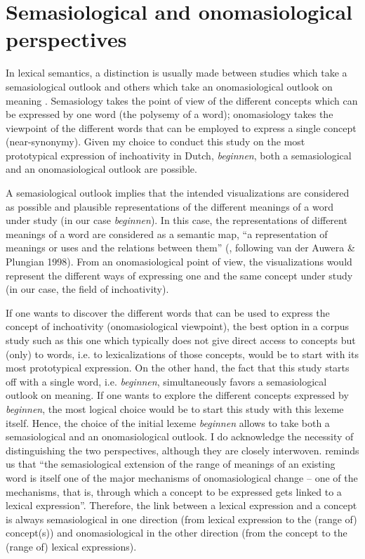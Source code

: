 \section{Semasiological and onomasiological perspectives} 
\label{sec:3.2}  
In lexical semantics, a distinction is usually made between studies which take a semasiological outlook and others which take an onomasiological outlook on meaning \citep{geeraerts_structure_1994}. Semasiology takes the point of view of the different concepts which can be expressed by one word (the polysemy of a word); onomasiology takes the viewpoint of the different words that can be employed to express a single concept (near-synonymy). Given my choice to conduct this study on the most prototypical expression of inchoativity in Dutch, \textit{beginnen}, both a semasiological and an onomasiological outlook are possible.

A semasiological outlook implies that the intended visualizations are considered as possible and plausible representations of the different meanings of a word under study (in our case \textit{beginnen}). In this case, the representations of different meanings of a word are considered as a semantic map, “a representation of meanings or uses and the relations between them” (\citealt[23]{simon-vandenbergen_semantic_2007}, following van der Auwera \& Plungian 1998). From an onomasiological point of view, the visualizations would represent the different ways of expressing one and the same concept under study (in our case, the field of inchoativity).

If one wants to discover the different words that can be used to express the concept of inchoativity (onomasiological viewpoint), the best option in a corpus study such as this one which typically does not give direct access to concepts but (only) to words, i.e. to lexicalizations of those concepts, would be to start with its most prototypical expression. On the other hand, the fact that this study starts off with a single word, i.e. \textit{beginnen}, simultaneously favors a semasiological outlook on meaning. If one wants to explore the different concepts expressed by \textit{beginnen}, the most logical choice would be to start this study with this lexeme itself. Hence, the choice of the initial lexeme \textit{beginnen} allows to take both a semasiological and an onomasiological outlook. I do acknowledge the necessity of distinguishing the two perspectives, although they are closely interwoven. \citet[30]{geeraerts_theories_2010} reminds us that “the semasiological extension of the range of meanings of an existing word is itself one of the major mechanisms of onomasiological change – one of the mechanisms, that is, through which a concept to be expressed gets linked to a lexical expression”. Therefore, the link between a lexical expression and a concept is always semasiological in one direction (from lexical expression to the (range of) concept(s)) and onomasiological in the other direction (from the concept to the (range of) lexical expressions).


